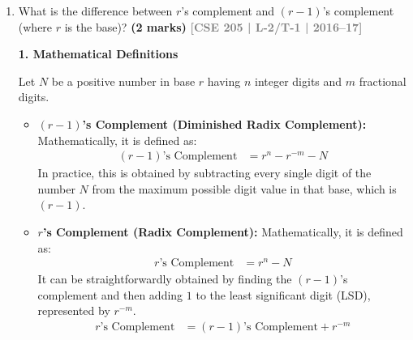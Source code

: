 \documentclass[12pt,a3paper]{article}
\newcommand{\yr}[1]{\hfill\textcolor{gray}{\small\textbf{[#1]}}}
\newcommand{\mk}[1]{\textcolor{orange!70!black}{\small\textbf{(#1 marks)}}}
\begin{document}
\begin{enumerate}
\begin{tcolorbox}[enhanced,breakable,ansbox,colback=cD!4,colframe=cD,boxrule=0.8pt,arc=5pt,title={\textbf{Answer}},fonttitle=\bfseries\color{white},colbacktitle=cD]
3. No end carry is generated (Case $M < N$), which signifies a negative result. To find the final magnitude, we must take the 16's complement of the sum $F8.F_{16}$.
\begin{align*}
    \text{15's complement of } F8.F_{16} &= (F - F)(F - 8).(F - F) = 07.0_{16} \\
    \text{16's complement of } F8.F_{16} &= 07.0_{16} + 00.1_{16} = 07.1_{16}
\end{align*}

4. Affix the negative sign to the final magnitude:
\begin{align*}
    B &= -07.1_{16} = -7.1_{16}
\end{align*}

\vspace{0.5em}
\textbf{Final Answer:} The value of $9_{16} - 6.9_{16} - 9.8_{16}$ is $\mathbf{-7.1_{16}}$.

\end{tcolorbox}

\item What is the difference between $r$'s complement and $(r-1)$'s complement (where $r$ is the base)? 
\mk{2} \yr{CSE 205 | L-2/T-1 | 2016--17}

\begin{tcolorbox}[enhanced,breakable,ansbox,colback=cD!4,colframe=cD,boxrule=0.8pt,arc=5pt,title={\textbf{Answer}},fonttitle=\bfseries\color{white},colbacktitle=cD]

\textbf{\textcolor{cD}{1. Mathematical Definitions}}

Let $N$ be a positive number in base $r$ having $n$ integer digits and $m$ fractional digits. 

\begin{itemize}
    \item \textbf{$(r-1)$'s Complement (Diminished Radix Complement):}
    Mathematically, it is defined as:
    \begin{align*}
        (r-1)\text{'s Complement} &= r^n - r^{-m} - N
    \end{align*}
    In practice, this is obtained by subtracting every single digit of the number $N$ from the maximum possible digit value in that base, which is $(r-1)$.

    \item \textbf{$r$'s Complement (Radix Complement):}
    Mathematically, it is defined as:
    \begin{align*}
        r\text{'s Complement} &= r^n - N
    \end{align*}
    It can be straightforwardly obtained by finding the $(r-1)$'s complement and then adding $1$ to the least significant digit (LSD), represented by $r^{-m}$.
    \begin{align*}
        r\text{'s Complement} &= (r-1)\text{'s Complement} + r^{-m}
    \end{align*}
\end{itemize}


\end{tcolorbox}
\end{enumerate}
\end{document}
